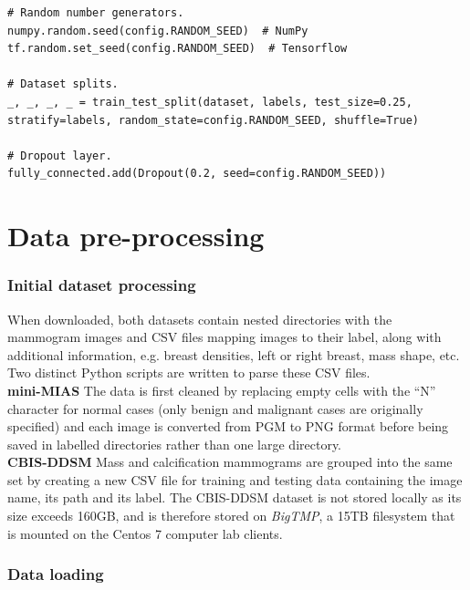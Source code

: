 \begin{lstlisting}[numbers=none]
# Random number generators.
numpy.random.seed(config.RANDOM_SEED)  # NumPy
tf.random.set_seed(config.RANDOM_SEED)  # Tensorflow

# Dataset splits.
_, _, _, _ = train_test_split(dataset, labels, test_size=0.25, stratify=labels, random_state=config.RANDOM_SEED, shuffle=True)

# Dropout layer.
fully_connected.add(Dropout(0.2, seed=config.RANDOM_SEED))
\end{lstlisting}


\section{Data pre-processing}

\subsubsection{Initial dataset processing}

When downloaded, both datasets contain nested directories with the mammogram images and CSV files mapping images to their label, along with additional information, e.g. breast densities, left or right breast, mass shape, etc. Two distinct Python scripts are written to parse these CSV files.\\

\textbf{mini-MIAS} \space The data is first cleaned by replacing empty cells with the ``N'' character for normal cases (only benign and malignant cases are originally specified) and each image is converted from PGM to PNG format before being saved in labelled directories rather than one large directory.\\

\textbf{CBIS-DDSM} \space Mass and calcification mammograms are grouped into the same set by creating a new CSV file for training and testing data containing the image name, its path and its label. The CBIS-DDSM dataset is not stored locally as its size exceeds 160GB, and is therefore stored on \textit{BigTMP}, a 15TB filesystem that is mounted on the Centos 7 computer lab clients.


\subsubsection{Data loading}

